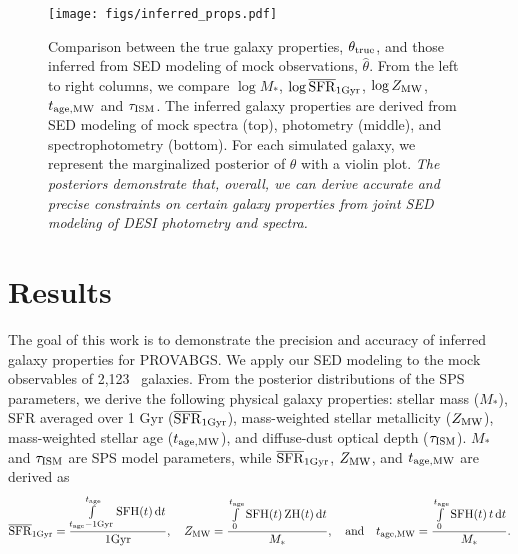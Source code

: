 \begin{figure}
\begin{center}
\texttt{[image: figs/inferred\_props.pdf]}
\caption{
    Comparison between the true galaxy properties, $\theta_{\rm true}$, and
    those inferred from SED modeling of mock observations, $\hat{\theta}$. 
    From the left to right columns, we compare $\log M_*$, $\log \overline{\rm SFR}_{\rm 1Gyr}$, 
    $\log Z_{\rm MW}$, $t_{\rm age, MW}$ and $\tau_{\rm ISM}$. 
    The inferred galaxy properties are derived from SED modeling of mock
    spectra (top), photometry (middle), and spectrophotometry (bottom). 
    For each simulated galaxy, we represent the marginalized posterior of
    $\theta$ with a violin plot.  %
    \emph{The posteriors demonstrate that, overall, we can derive accurate and 
    precise constraints on certain galaxy properties from joint SED modeling of
    DESI photometry and spectra.}
    } \label{fig:prop_inf}
\end{center}
\end{figure}

\section{Results} \label{sec:results}
The goal of this work is to demonstrate the precision and accuracy of inferred
galaxy properties for PROVABGS. 
We apply our SED modeling to the mock observables of 2,123 \lgal~galaxies.
From the posterior distributions of the SPS parameters, we derive the following
physical galaxy properties: stellar mass ($M_*$), SFR averaged over 1 Gyr
($\overline{\rm SFR}_{\rm 1Gyr}$), mass-weighted stellar metallicity ($Z_{\rm MW}$), mass-weighted
stellar age ($t_{\rm age, MW}$), and diffuse-dust optical depth ($\tau_{\rm ISM}$).
$M_*$ and $\tau_{\rm ISM}$ are SPS model parameters, while $\overline{\rm SFR}_{\rm 1Gyr}$, 
$Z_{\rm MW}$, and $t_{\rm age, MW}$ are derived as 
\begin{equation} \label{eq:prop_eqs}
    \avgsfr = \frac{\int\limits_{t_{\rm age} - {\rm 1 Gyr}}^{t_{\rm age}}{\rm
    SFH}(t)\,{\rm d}t}{{\rm 1 Gyr}}, \quad
    Z_{\rm MW} = \frac{\int\limits_0^{t_{\rm age}}{\rm SFH}(t)\,{\rm
    ZH}(t)\,{\rm d}t}{M_*}, \quad{\rm and}\quad
    \tage = \frac{\int\limits_0^{t_{\rm age}}{\rm SFH}(t)\,t\,{\rm d}t}{M_*}.
\end{equation} 

